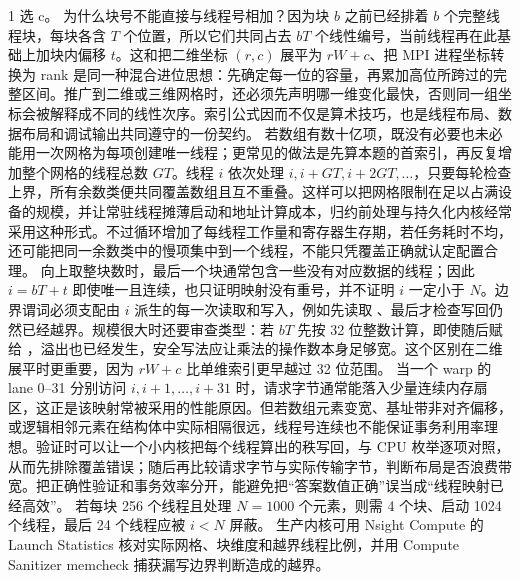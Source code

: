 \begin{solutionexercise}{1}
\conclusionheading 选 c。
\discussionheading
{}
为什么块号不能直接与线程号相加？因为块 $b$ 之前已经排着 $b$ 个完整线程块，每块各含 $T$ 个位置，所以它们共同占去 $bT$ 个线性编号，当前线程再在此基础上加块内偏移 $t$。这和把二维坐标 $(r,c)$ 展平为 $rW+c$、把 MPI 进程坐标转换为 rank 是同一种混合进位思想：先确定每一位的容量，再累加高位所跨过的完整区间。推广到二维或三维网格时，还必须先声明哪一维变化最快，否则同一组坐标会被解释成不同的线性次序。索引公式因而不仅是算术技巧，也是线程布局、数据布局和调试输出共同遵守的一份契约。
若数组有数十亿项，既没有必要也未必能用一次网格为每项创建唯一线程；更常见的做法是先算本题的首索引，再反复增加整个网格的线程总数 $G T$。线程 $i$ 依次处理 $i,i+GT,i+2GT,\ldots$，只要每轮检查上界，所有余数类便共同覆盖数组且互不重叠。这样可以把网格限制在足以占满设备的规模，并让常驻线程摊薄启动和地址计算成本，归约前处理与持久化内核经常采用这种形式。不过循环增加了每线程工作量和寄存器生存期，若任务耗时不均，还可能把同一余数类中的慢项集中到一个线程，不能只凭覆盖正确就认定配置合理。
向上取整块数时，最后一个块通常包含一些没有对应数据的线程；因此 $i=bT+t$ 即使唯一且连续，也只证明映射没有重号，并不证明 $i$ 一定小于 $N$。边界谓词必须支配由 $i$ 派生的每一次读取和写入，例如先读取 、最后才检查写回仍然已经越界。规模很大时还要审查类型：若 $bT$ 先按 32 位整数计算，即使随后赋给 ，溢出也已经发生，安全写法应让乘法的操作数本身足够宽。这个区别在二维展平时更重要，因为 $rW+c$ 比单维索引更早越过 32 位范围。
当一个 warp 的 lane 0--31 分别访问 $i,i+1,\ldots,i+31$ 时，请求字节通常能落入少量连续内存扇区，这正是该映射常被采用的性能原因。但若数组元素变宽、基址带非对齐偏移，或逻辑相邻元素在结构体中实际相隔很远，线程号连续也不能保证事务利用率理想。验证时可以让一个小内核把每个线程算出的秩写回，与 CPU 枚举逐项对照，从而先排除覆盖错误；随后再比较请求字节与实际传输字节，判断布局是否浪费带宽。把正确性验证和事务效率分开，能避免把“答案数值正确”误当成“线程映射已经高效”。
\variantheading 若每块 256 个线程且处理 $N=1000$ 个元素，则需 4 个块、启动 1024 个线程，最后 24 个线程应被 $i<N$ 屏蔽。
\practiceheading 生产内核可用 Nsight Compute 的 Launch Statistics 核对实际网格、块维度和越界线程比例，并用 Compute Sanitizer memcheck 捕获漏写边界判断造成的越界。
\end{solutionexercise}

